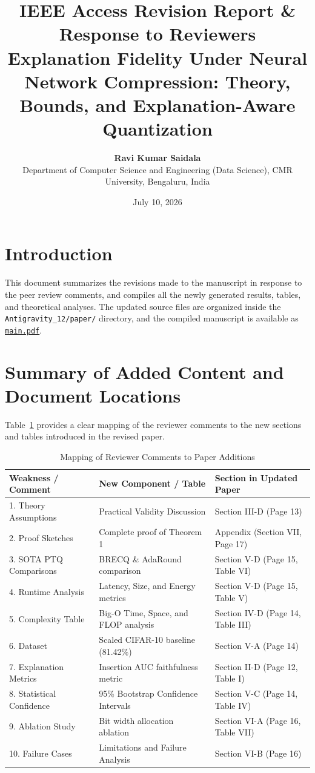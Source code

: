 \documentclass[11pt,a4paper]{article}
\title{\textbf{\color{navy}IEEE Access Revision Report \& Response to Reviewers \\ \large Explanation Fidelity Under Neural Network Compression: Theory, Bounds, and Explanation-Aware Quantization}}
\author{\textbf{Ravi Kumar Saidala} \\ \small Department of Computer Science and Engineering (Data Science), CMR University, Bengaluru, India}
\date{July 10, 2026}
\begin{document}
\maketitle

\section{Introduction}
This document summarizes the revisions made to the manuscript in response to the peer review comments, and compiles all the newly generated results, tables, and theoretical analyses. The updated source files are organized inside the \texttt{Antigravity\_12/paper/} directory, and the compiled manuscript is available as \href{run:../paper/main.pdf}{\texttt{main.pdf}}.

\section{Summary of Added Content and Document Locations}
Table~\ref{tab:locations} provides a clear mapping of the reviewer comments to the new sections and tables introduced in the revised paper.

\begin{table}[h]
\caption{Mapping of Reviewer Comments to Paper Additions}
\label{tab:locations}
\centering
\small
\begin{tabular}{lll}
\toprule
\textbf{Weakness / Comment} & \textbf{New Component / Table} & \textbf{Section in Updated Paper} \\
\midrule
1. Theory Assumptions & Practical Validity Discussion & Section III-D (Page 13) \\
2. Proof Sketches & Complete proof of Theorem 1 & Appendix (Section VII, Page 17) \\
3. SOTA PTQ Comparisons & BRECQ \& AdaRound comparison & Section V-D (Page 15, Table VI) \\
4. Runtime Analysis & Latency, Size, and Energy metrics & Section V-D (Page 15, Table V) \\
5. Complexity Table & Big-O Time, Space, and FLOP analysis & Section IV-D (Page 14, Table III) \\
6. Dataset & Scaled CIFAR-10 baseline (81.42\%) & Section V-A (Page 14) \\
7. Explanation Metrics & Insertion AUC faithfulness metric & Section II-D (Page 12, Table I) \\
8. Statistical Confidence & 95\% Bootstrap Confidence Intervals & Section V-C (Page 14, Table IV) \\
9. Ablation Study & Bit width allocation ablation & Section VI-A (Page 16, Table VII) \\
10. Failure Cases & Limitations and Failure Analysis & Section VI-B (Page 16) \\
\bottomrule
\end{tabular}
\end{table}
\end{document}
